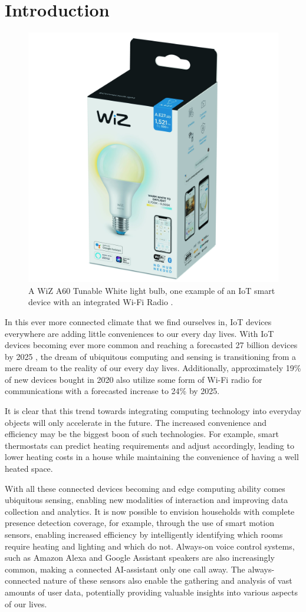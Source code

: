 \chapter{Introduction}\label{chapter:introduction}

\begin{figure}[b]
	\centering
	\includegraphics[width=0.3\linewidth]{figures/wiz-a60-tunable-white}
	\caption{A WiZ A60 Tunable White light bulb, one example of an IoT smart device with an integrated Wi-Fi Radio \cite{signify2020wiz}.}
	\label{fig:wiz-lightbulb}
\end{figure}

In this ever more connected climate that we find ourselves in, IoT devices everywhere are adding little conveniences to our every day lives.
With IoT devices becoming ever more common and reaching a forecasted 27 billion devices by 2025 \cite{hasan2022state}, the dream of ubiquitous computing and sensing is transitioning from a mere dream to the reality of our every day lives.
Additionally, approximately 19\% of new devices bought in 2020 also utilize some form of Wi-Fi radio for communications with a forecasted increase to 24\% by 2025.

It is clear that this trend towards integrating computing technology into everyday objects will only accelerate in the future.
The increased convenience and efficiency may be the biggest boon of such technologies.
For example, smart thermostats can predict heating requirements and adjust accordingly, leading to lower heating costs in a house while maintaining the convenience of having a well heated space.

With all these connected devices becoming and edge computing ability comes ubiquitous sensing, enabling new modalities of interaction and improving data collection and analytics.
It is now possible to envision households with complete presence detection coverage, for example, through the use of smart motion sensors, enabling increased efficiency by intelligently identifying which rooms require heating and lighting and which do not.
Always-on voice control systems, such as Amazon Alexa and Google Assistant speakers are also increasingly common, making a connected AI-assistant only one call away.
The always-connected nature of these sensors also enable the gathering and analysis of vast amounts of user data, potentially providing valuable insights into various aspects of our lives.

